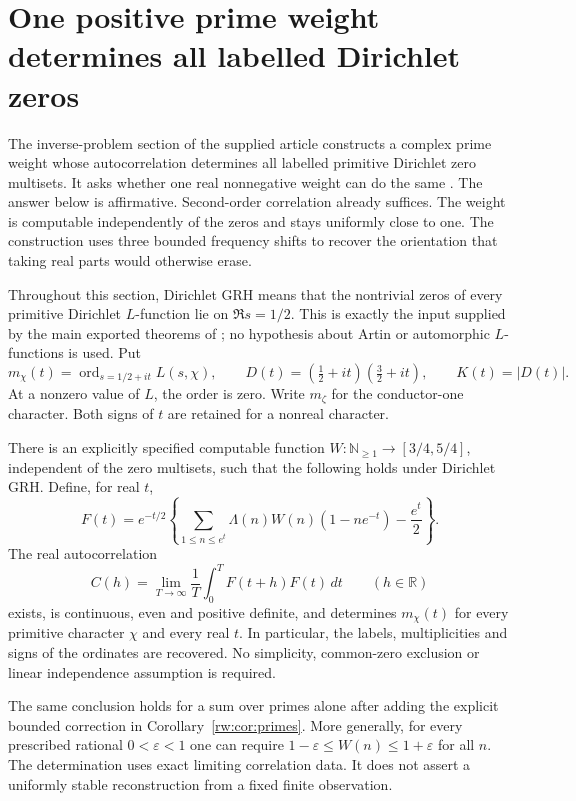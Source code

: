 \section{One positive prime weight determines all labelled Dirichlet zeros}
\label{rw:sec:main}

The inverse-problem section of the supplied article constructs a complex
prime weight whose autocorrelation determines all labelled primitive
Dirichlet zero multisets. It asks whether one real nonnegative weight can
do the same \cite[section ``Recovering zeros and characters from prime
data'', final question ``Fewer filters and weights'']{ProveItArticle}.
The answer below is affirmative. Second-order correlation already suffices.
The weight is computable independently of the zeros and stays uniformly
close to one. The construction uses three bounded frequency shifts to
recover the orientation that taking real parts would otherwise erase.

Throughout this section, Dirichlet GRH means that the nontrivial zeros of
every primitive Dirichlet $L$-function lie on $\Re s=1/2$. This is exactly
the input supplied by the main exported theorems of \cite{GRHLean}; no
hypothesis about Artin or automorphic $L$-functions is used. Put
\[
 m_\chi(t)=\operatorname{ord}_{s=1/2+it}L(s,\chi),\qquad
 D(t)=(\tfrac12+it)(\tfrac32+it),\qquad
 K(t)=|D(t)|.
\]
At a nonzero value of $L$, the order is zero. Write $m_\zeta$ for the
conductor-one character. Both signs of $t$ are retained for a nonreal
character.

\begin{theorem}
\label{rw:thm:encoder}
There is an explicitly specified computable function
$W:\mathbb N_{\ge1}\to[3/4,5/4]$, independent of the zero multisets, such that the
following holds under Dirichlet GRH. Define, for real $t$,
\[
 F(t)=e^{-t/2}\left\{
 \sum_{1\le n\le e^t}\Lambda(n)W(n)(1-ne^{-t})-\frac{e^t}{2}\right\}.
\]
The real autocorrelation
\[
 C(h)=\lim_{T\to\infty}\frac1T\int_0^T F(t+h)F(t)\,dt
 \qquad(h\in\mathbb R)
\]
exists, is continuous, even and positive definite, and determines
$m_\chi(t)$ for every primitive character $\chi$ and every real $t$.
In particular, the labels, multiplicities and signs of the ordinates are
recovered. No simplicity, common-zero exclusion or linear independence
assumption is required.

The same conclusion holds for a sum over primes alone after adding the
explicit bounded correction in Corollary~\ref{rw:cor:primes}.
More generally, for every prescribed rational $0<\varepsilon<1$ one
can require $1-\varepsilon\le W(n)\le1+\varepsilon$ for all $n$.
The determination uses exact limiting correlation data. It does not
assert a uniformly stable reconstruction from a fixed finite observation.
\end{theorem}

